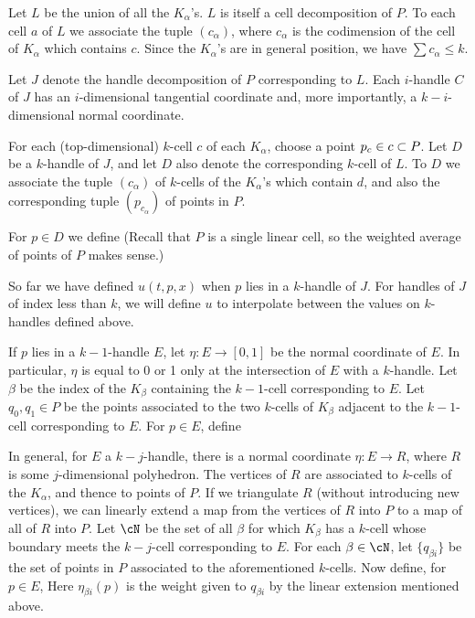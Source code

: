\documentclass[11pt,leqno]{amsart}
\begin{document}
Let $L$ be the union of all the $K_\alpha$'s.
$L$ is itself a cell decomposition of $P$.
To each cell $a$ of $L$ we associate the tuple $(c_\alpha)$,
where $c_\alpha$ is the codimension of the cell of $K_\alpha$ which contains $c$.
Since the $K_\alpha$'s are in general position, we have $\sum c_\alpha \le k$.

Let $J$ denote the handle decomposition of $P$ corresponding to $L$.
Each $i$-handle $C$ of $J$ has an $i$-dimensional tangential coordinate and,
more importantly, a $k{-}i$-dimensional normal coordinate.

For each (top-dimensional) $k$-cell $c$ of each $K_\alpha$, choose a point $p_c \in c \subset P$.
Let $D$ be a $k$-handle of $J$, and let $D$ also denote the corresponding
$k$-cell of $L$.
To $D$ we associate the tuple $(c_\alpha)$ of $k$-cells of the $K_\alpha$'s
which contain $d$, and also the corresponding tuple $(p_{c_\alpha})$ of points in $P$.

For $p \in D$ we define
(Recall that $P$ is a single linear cell, so the weighted average of points of $P$
makes sense.)

So far we have defined $u(t, p, x)$ when $p$ lies in a $k$-handle of $J$.
For handles of $J$ of index less than $k$, we will define $u$ to
interpolate between the values on $k$-handles defined above.

If $p$ lies in a $k{-}1$-handle $E$, let $\eta : E \to [0,1]$ be the normal coordinate
of $E$.
In particular, $\eta$ is equal to 0 or 1 only at the intersection of $E$
with a $k$-handle.
Let $\beta$ be the index of the $K_\beta$ containing the $k{-}1$-cell
corresponding to $E$.
Let $q_0, q_1 \in P$ be the points associated to the two $k$-cells of $K_\beta$
adjacent to the $k{-}1$-cell corresponding to $E$.
For $p \in E$, define

In general, for $E$ a $k{-}j$-handle, there is a normal coordinate
$\eta: E \to R$, where $R$ is some $j$-dimensional polyhedron.
The vertices of $R$ are associated to $k$-cells of the $K_\alpha$, and thence to points of $P$.
If we triangulate $R$ (without introducing new vertices), we can linearly extend
a map from the vertices of $R$ into $P$ to a map of all of $R$ into $P$.
Let $\cN$ be the set of all $\beta$ for which $K_\beta$ has a $k$-cell whose boundary meets
the $k{-}j$-cell corresponding to $E$.
For each $\beta \in \cN$, let $\{q_{\beta i}\}$ be the set of points in $P$ associated to the aforementioned $k$-cells.
Now define, for $p \in E$,
Here $\eta_{\beta i}(p)$ is the weight given to $q_{\beta i}$ by the linear extension
mentioned above.
\end{document}
